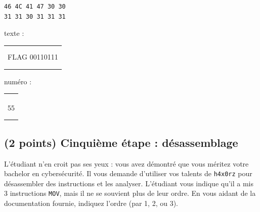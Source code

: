 \documentclass[11pt,a4paper]{article}
\begin{document}
\begin{table}[ht!]
  \centering
  \begin{minipage}{0.3\textwidth}
    \centering

\begin{lstlisting}[style=algorithmique]
46 4C 41 47 30 30
31 31 30 31 31 31
\end{lstlisting}

  \end{minipage}
  \hfillx
  \begin{minipage}{0.3\textwidth}
    \centering

texte :

\medskip

\begin{tabular}{ | m{2.5cm} | }
\hline
 \\ \\ %
FLAG 00110111
 \\ \\ \\
\hline
\end{tabular}

  \end{minipage}
  \hfillx
  \begin{minipage}{0.3\textwidth}
    \centering

numéro :

\medskip

\begin{tabular}{ | m{2.5cm} | }
\hline
 \\ \\ \\
55
 \\ \\ \\
\hline
\end{tabular}

  \end{minipage}
\end{table}


\subsection{(2 points) Cinquième étape : désassemblage }

L'étudiant n'en croit pas ses yeux : vous avez démontré que vous méritez votre bachelor en cybersécurité.
Il vous demande d'utiliser vos talents de \texttt{h4x0rz} pour désassembler des instructions et les analyser.
L'étudiant vous indique qu'il a mis 3 instructions \texttt{MOV}, mais il ne se souvient plus de leur ordre.
En vous aidant de la documentation fournie, indiquez l'ordre (par 1, 2, ou 3).
\end{document}
